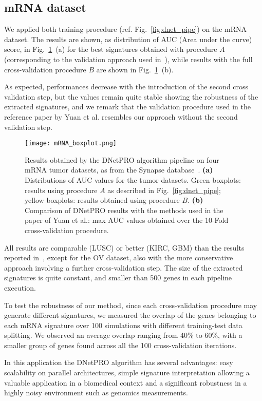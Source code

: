\documentclass{standalone}
\begin{document}
\subsection[mRNA data]{mRNA dataset}\label{synapse:mRNA}

We applied both training procedure (ref. Fig.~\ref{fig:dnet_pipe}) on the mRNA dataset.
The results are shown, as distribution of AUC (Area under the curve) score, in Fig.~\ref{fig:dnet_results}~(a) for the best signatures obtained with procedure $A$ (corresponding to the validation approach used in~\cite{Yuan2014}), while results with the full cross-validation procedure $B$ are shown in Fig.~\ref{fig:dnet_results}~(b).

As expected, performances decrease with the introduction of the second cross validation step, but the values remain quite stable showing the robustness of the extracted signatures, and we remark that the validation procedure used in the reference paper by Yuan et al. resembles our approach without the second validation step.

\begin{figure}[htbp]
\texttt{[image: mRNA\_boxplot.png]}
\qquad
\centering
\def\svgwidth{0.45\textwidth}

\caption{Results obtained by the DNetPRO algorithm pipeline on four mRNA tumor datasets, as from the Synapse database~\cite{Yuan2014}.
\textbf{(a)} Distributions of AUC values for the tumor datasets. Green boxplots: results using procedure $A$ as described in Fig.~\ref{fig:dnet_pipe}; yellow boxplots: results obtained using procedure $B$.
\textbf{(b)} Comparison of DNetPRO results with the methods used in the paper of Yuan et al.: max AUC values obtained over the 10-Fold cross-validation procedure.
}
\label{fig:dnet_results}
\end{figure}

All results are comparable (LUSC) or better (KIRC, GBM) than the results reported in~\cite{Yuan2014}, except for the OV dataset, also with the more conservative approach involving a further cross-validation step.
The size of the extracted signatures is quite constant, and smaller than 500 genes in each pipeline execution.

To test the robustness of our method, since each cross-validation procedure may generate different signatures, we measured the overlap of the genes belonging to each mRNA signature over 100 simulations with different training-test data splitting.
We observed an average overlap ranging from 40\% to 60\%, with a smaller group of genes found across all the 100 cross-validation iterations.

In this application the DNetPRO algorithm has several advantages: easy scalability on parallel architectures, simple signature interpretation allowing a valuable application in a biomedical context and a significant robustness in a highly noisy environment such as genomics measurements.
\end{document}
